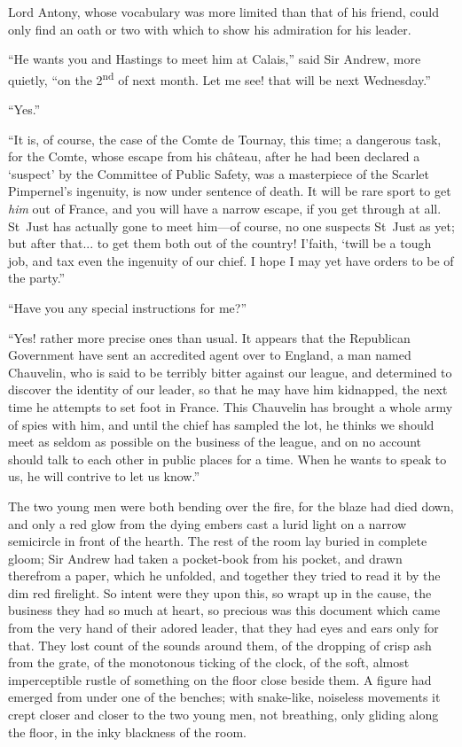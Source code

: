 Lord Antony, whose vocabulary was more limited than that of his friend, could only find an oath or two with which to show his admiration for his leader.

\enquote{He wants you and Hastings to meet him at Calais,} said Sir Andrew, more quietly, \enquote{on the 2\textsuperscript{nd} of next month. Let me see! that will be next Wednesday.}

\enquote{Yes.}

\enquote{It is, of course, the case of the Comte de Tournay, this time; a dangerous task, for the Comte, whose escape from his château, after he had been declared a \enquote{suspect} by the Committee of Public Safety, was a masterpiece of the Scarlet Pimpernel's ingenuity, is now under sentence of death. It will be rare sport to get \textit{him} out of France, and you will have a narrow escape, if you get through at all. St~Just has actually gone to meet him---of course, no one suspects St~Just as yet; but after that... to get them both out of the country! I'faith, `twill be a tough job, and tax even the ingenuity of our chief. I hope I may yet have orders to be of the party.}

\enquote{Have you any special instructions for me?}

\enquote{Yes! rather more precise ones than usual. It appears that the Republican Government have sent an accredited agent over to England, a man named Chauvelin, who is said to be terribly bitter against our league, and determined to discover the identity of our leader, so that he may have him kidnapped, the next time he attempts to set foot in France. This Chauvelin has brought a whole army of spies with him, and until the chief has sampled the lot, he thinks we should meet as seldom as possible on the business of the league, and on no account should talk to each other in public places for a time. When he wants to speak to us, he will contrive to let us know.}

The two young men were both bending over the fire, for the blaze had died down, and only a red glow from the dying embers cast a lurid light on a narrow semicircle in front of the hearth. The rest of the room lay buried in complete gloom; Sir Andrew had taken a pocket-book from his pocket, and drawn therefrom a paper, which he unfolded, and together they tried to read it by the dim red firelight. So intent were they upon this, so wrapt up in the cause, the business they had so much at heart, so precious was this document which came from the very hand of their adored leader, that they had eyes and ears only for that. They lost count of the sounds around them, of the dropping of crisp ash from the grate, of the monotonous ticking of the clock, of the soft, almost imperceptible rustle of something on the floor close beside them. A figure had emerged from under one of the benches; with snake-like, noiseless movements it crept closer and closer to the two young men, not breathing, only gliding along the floor, in the inky blackness of the room.

